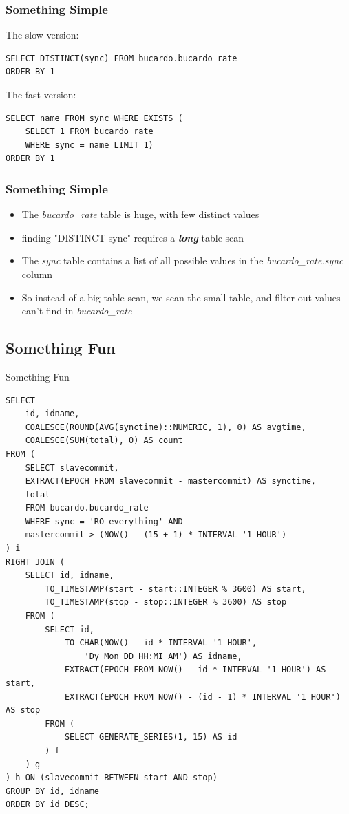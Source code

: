 \documentclass{beamer}
\begin{document}
\begin{frame}[fragile]
    \frametitle{Something Simple}
    The slow version:
    \begin{verbatim}
SELECT DISTINCT(sync) FROM bucardo.bucardo_rate
ORDER BY 1
    \end{verbatim}
    The fast version:
    \begin{verbatim}
SELECT name FROM sync WHERE EXISTS (
    SELECT 1 FROM bucardo_rate
    WHERE sync = name LIMIT 1)
ORDER BY 1
    \end{verbatim}
\end{frame}

\begin{frame}
    \frametitle{Something Simple}
    \begin{itemize}
        \item The \emph{bucardo\_rate} table is huge, with few distinct values
        \pause
        \item finding "DISTINCT sync" requires a \textbf{\emph{long}} table scan
        \pause
        \item The \emph{sync} table contains a list of all possible values in the \emph{bucardo\_rate.sync} column
        \pause
        \item So instead of a big table scan, we scan the small table, and filter out values can't find in \emph{bucardo\_rate}
    \end{itemize}
\end{frame}

\subsection{Something Fun}
\begin{frame}
    \begin{center}Something Fun\end{center}
\end{frame}

\begin{frame}[fragile]
    \tiny
    \begin{verbatim}
SELECT
    id, idname,
    COALESCE(ROUND(AVG(synctime)::NUMERIC, 1), 0) AS avgtime,
    COALESCE(SUM(total), 0) AS count
FROM (
    SELECT slavecommit,
    EXTRACT(EPOCH FROM slavecommit - mastercommit) AS synctime,
    total
    FROM bucardo.bucardo_rate
    WHERE sync = 'RO_everything' AND
    mastercommit > (NOW() - (15 + 1) * INTERVAL '1 HOUR')
) i
RIGHT JOIN (
    SELECT id, idname,
        TO_TIMESTAMP(start - start::INTEGER % 3600) AS start,
        TO_TIMESTAMP(stop - stop::INTEGER % 3600) AS stop
    FROM (
        SELECT id,
            TO_CHAR(NOW() - id * INTERVAL '1 HOUR', 
                'Dy Mon DD HH:MI AM') AS idname,
            EXTRACT(EPOCH FROM NOW() - id * INTERVAL '1 HOUR') AS start,
            EXTRACT(EPOCH FROM NOW() - (id - 1) * INTERVAL '1 HOUR') AS stop
        FROM (
            SELECT GENERATE_SERIES(1, 15) AS id
        ) f
    ) g
) h ON (slavecommit BETWEEN start AND stop)
GROUP BY id, idname
ORDER BY id DESC;
    \end{verbatim}
\end{frame}
\end{document}
